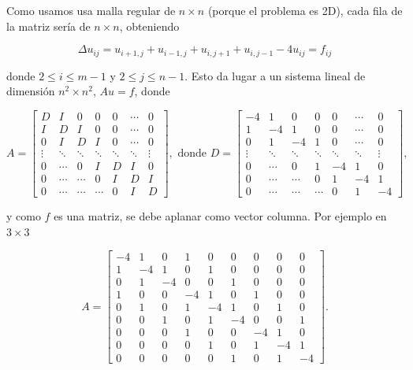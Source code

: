     Como usamos usa malla regular de $n \times n$ (porque el problema es  2D), cada fila de la matriz sería de $n\times n$, obteniendo

    \[
    \Delta u_{ij} =  u_{i+1, j} + u_{i-1, j} + u_{i, j+1} + u_{i, j-1} - 4 u_{ij} = f_{ij}
    \]

    donde \(2 \leq i \leq m-1\) y \(2 \leq j \leq n-1\). Esto da lugar a un sistema lineal de dimensión \(n^2 \times  n^2\),  $A u=f$, donde 

    $$
    A=\left[\begin{array}{ccccccc}
    D & I & 0 & 0 & 0 & \cdots & 0 \\
    I & D & I & 0 & 0 & \cdots & 0 \\
    0 & I & D & I & 0 & \cdots & 0 \\
    \vdots & \ddots & \ddots & \ddots & \ddots & \ddots & \vdots \\
    0 & \cdots & 0 & I & D & I & 0 \\
    0 & \cdots & \cdots & 0 & I & D & I \\
    0 & \cdots & \cdots & \cdots & 0 & I & D
    \end{array}\right], \text{ donde }  D=\left[\begin{array}{ccccccc}
    -4 & 1 & 0 & 0 & 0 & \cdots & 0 \\
    1 & -4 & 1 & 0 & 0 & \cdots & 0 \\
    0 & 1 & -4 & 1 & 0 & \cdots & 0 \\
    \vdots & \ddots & \ddots & \ddots & \ddots & \ddots & \vdots \\
    0 & \cdots & 0 & 1 & -4 & 1 & 0 \\
    0 & \cdots & \cdots & 0 & 1 & -4 & 1 \\
    0 & \cdots & \cdots & \cdots & 0 & 1 & -4
    \end{array}\right],
    $$

    y como $f$ es una matriz, se debe aplanar como vector columna. Por ejemplo en $3\times 3$

    $$
    A=\left[\begin{array}{ccc|ccc|ccc}
    -4 & 1 & 0 & 1 & 0 & 0 & 0 & 0 & 0 \\
    1 & -4 & 1 & 0 & 1 & 0 & 0 & 0 & 0 \\
    0 & 1 & -4 & 0 & 0 & 1 & 0 & 0 & 0 \\
    \hline1 & 0 & 0 & -4 & 1 & 0 & 1 & 0 & 0 \\
    0 & 1 & 0 & 1 & -4 & 1 & 0 & 1 & 0 \\
    0 & 0 & 1 & 0 & 1 & -4 & 0 & 0 & 1 \\
    \hline 0 & 0 & 0 & 1 & 0 & 0 & -4 & 1 & 0 \\
    0 & 0 & 0 & 0 & 1 & 0 & 1 & -4 & 1 \\
    0 & 0 & 0 & 0 & 0 & 1 & 0 & 1 & -4
    \end{array}\right].
    $$

